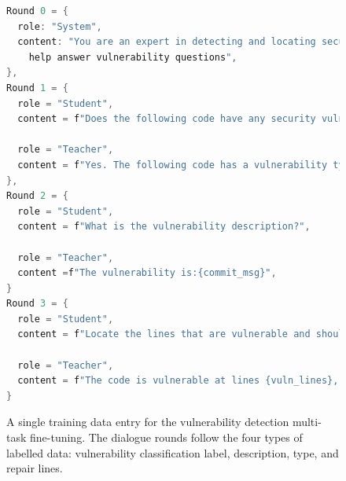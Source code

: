 \documentclass[12pt,openany,oneside,table]{cmuthesis}
\begin{document}
\begin{figure}[t!]
\centering
\begin{lstlisting}[numbersep=5pt,xleftmargin=21pt,numberstyle=\scriptsize,basicstyle=\footnotesize\ttfamily,firstnumber=1, language=C, language=C]
Round 0 = {
  role: "System",
  content: "You are an expert in detecting and locating security vulnerabilities, and can 
    help answer vulnerability questions", 
},
Round 1 = {
  role = "Student",
  content = f"Does the following code have any security vulnerabilities: {code_snippet}",

  role = "Teacher",
  content = f"Yes. The following code has a vulnerability type {cwe_type}.",
},
Round 2 = {
  role = "Student",
  content = f"What is the vulnerability description?",

  role = "Teacher",
  content =f"The vulnerability is:{commit_msg}",
}    
Round 3 = {
  role = "Student",
  content = f"Locate the lines that are vulnerable and should be repaired.",

  role = "Teacher",
  content = f"The code is vulnerable at lines {vuln_lines}, with the following fix: {fixing_code}",
}
\end{lstlisting}
\vspace*{-2mm}
\caption{\small A single training data entry for  the vulnerability detection multi-task fine-tuning. The dialogue rounds follow the four types of labelled data: vulnerability classification label,  description, type, and repair lines. 
}
\label{code:dialogue}
\end{figure}
\end{document}
